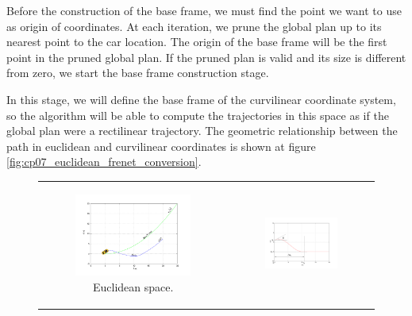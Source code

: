 Before the construction of the base frame, we must find the point we want to use as origin of coordinates. At each iteration,  we prune the global plan up to its nearest point to the car location. The origin of the base frame will be the first point in the pruned global plan. If the pruned plan is valid and its size is different from zero, we start the base frame construction stage.

In this stage, we will define the base frame of the curvilinear coordinate system, so the algorithm will be able to compute the trajectories in this space as if the global plan were a rectilinear trajectory. The geometric relationship between the path in euclidean and curvilinear coordinates is shown at figure \ref{fig:cp07_euclidean_frenet_conversion}.

\begin{figure}[h!]
\centering
\begin{tabular}{cc}
  \begin{subfigure}[b]{0.45\textwidth}
      \centering
      \includegraphics[width=\textwidth, trim=50 30 80 60,clip]{justOneCartesian45}
      \caption{Euclidean space.}
      \label{fig:cp07_justOneCartesian45}
  \end{subfigure} &
  \begin{subfigure}[b]{0.45\textwidth}
    \centering
    \includegraphics[width=\textwidth, trim=50 30 80 60,clip]{justOneFrenet45}

\end{subfigure}
\end{tabular}
\end{figure}

